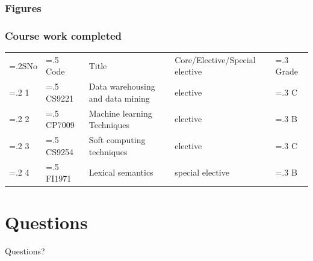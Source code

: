 \documentclass[11pt]{beamer}
\begin{document}
\begin{frame}
  \frametitle{Figures}
  \begin{minipage}{.45\linewidth}
    \begin{center}
      
    \end{center}
  \end{minipage}
  \begin{minipage}{.45\linewidth}
    \begin{center}
      
    \end{center}
  \end{minipage}

\end{frame}

\begin{frame}
  \frametitle{Course work completed}
  \small
  \begin{tabularx}{1.0\linewidth}{
      >{\hsize=.2\hsize}X
      >{\hsize=.5\hsize}X
      >{\hsize=2.4\hsize}X
      >{\hsize=1.6\hsize}X
      >{\hsize=.3\hsize}X} 
      \rowcolor{LightRed}SNo & Code & Title & Core/Elective/Special elective & Grade\\ 
      \rowcolor{LightBlue}   1 & CS9221 &  Data warehousing and data mining & elective & C\\
       \rowcolor{LightGreen}   2 & CP7009 & Machine learning Techniques & elective & B\\
      \rowcolor{LightBlue}   3 & CS9254 & Soft computing techniques & elective & C\\
      \rowcolor{LightGreen}   4 & FI1971 & Lexical semantics & special elective & B\\
  \end{tabularx}
\end{frame}

\section{Questions}
\begin{frame}{}
  \vfill
  \begin{center}
    Questions?
  \end{center}
  \vfill
  
\end{frame}
\end{document}
